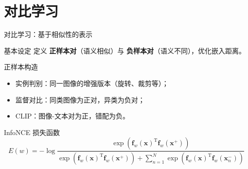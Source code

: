 \documentclass[t,aspectratio=169]{beamer} %
\begin{document}
\section{对比学习}
\begin{frame}{对比学习：基于相似性的表示}
\begin{block}{基本设定}
    定义 {\color{red}\textbf{正样本对}}（语义相似）与 {\color{red}\textbf{负样本对}}（语义不同），优化嵌入距离。
\end{block}

\begin{block}{正样本构造}
        \begin{itemize}
            \item 实例判别：同一图像的增强版本（旋转、裁剪等）；
            \item 监督对比：同类图像为正对，异类为负对；
            \item CLIP：图像-文本对为正，错配为负。
        \end{itemize}
\end{block}

\begin{block}{InfoNCE 损失函数}
\begin{equation}
    E(w) = -\log \frac{
        \exp\left(\mathbf{f}_w(\mathbf{x})^\mathrm{T} \mathbf{f}_w(\mathbf{x}^+)\right)
    }{
        \exp\left(\mathbf{f}_w(\mathbf{x})^\mathrm{T} \mathbf{f}_w(\mathbf{x}^+)\right)
        + 
        \sum_{n=1}^N 
        \exp\left(\mathbf{f}_w(\mathbf{x})^\mathrm{T} \mathbf{f}_w(\mathbf{x}_n^-)\right)
    }
    \tag{6.20}
\end{equation}
\end{block}

\end{frame}
\end{document}
